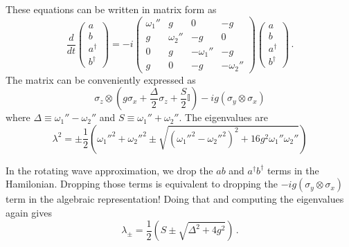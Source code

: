 These equations can be written in matrix form as
\begin{equation}
  \frac{d}{dt}
  \left( \begin{array}{c}
    a \\ b \\ a^\dagger \\ b^\dagger
  \end{array} \right)
  =
  -i \left( \begin{array}{cccc}
    \omega_1'' & g & 0 & -g \\
    g & \omega_2'' & -g & 0 \\
    0 & g & - \omega_1'' & -g \\
    g & 0 & -g & - \omega_2''
  \end{array} \right)
  \left( \begin{array}{c}
    a \\ b \\ a^\dagger \\ b^\dagger
  \end{array} \right)
  \, .
\end{equation}
The matrix can be conveniently expressed as
\begin{equation}
  \sigma_z \otimes \left(
    g \sigma_x + \frac{\Delta}{2} \sigma_z + \frac{S}{2} \mathbb{I}
  \right)
  -i g \left( \sigma_y \otimes \sigma_x \right)
\end{equation}
where $\Delta \equiv \omega_1'' - \omega_2''$ and $S \equiv \omega_1'' + \omega_2''$.
The eigenvalues are
\begin{equation}
  \lambda^2 =
  \pm \frac{1}{2}
  \left(
    \omega_1''^2 + \omega_2''^2
    \pm \sqrt{(\omega_1''^2 - \omega_2''^2)^2 + 16 g^2 \omega_1'' \omega_2''}
  \right)
\end{equation}

In the rotating wave approximation, we drop the $ab$ and $a^\dagger b^\dagger$ terms in the Hamilonian.
Dropping those terms is equivalent to dropping the $-i g \left( \sigma_y \otimes \sigma_x \right)$ term in the algebraic representation!
Doing that and computing the eigenvalues again gives
\begin{equation}
  \lambda_\pm =
  \frac{1}{2} \left( S \pm \sqrt{\Delta^2 + 4 g^2} \right) \, .
\end{equation}
